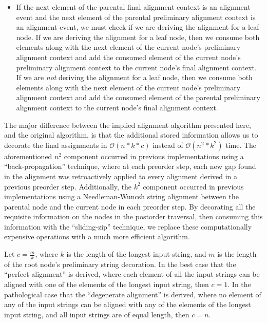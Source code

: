 \documentclass[11pt]{article}
\begin{document}
\begin{itemize}
\item If the next element of the parental final alignment context is an alignment event and the next element of the parental preliminary alignment context is an alignment event, we must check if we are deriving the alignment for a leaf node.
If we are deriving the alignment for a leaf node, then we consume both elements along with the next element of the current node's preliminary alignment context and add the consumed element of the current node's preliminary alignment context to the current node's final alignment context.
If we are \textit{not} deriving the alignment for a leaf node, then we consume both elements along with the next element of the current node's preliminary alignment context and add the consumed element of the parental preliminary alignment context to the current node's final alignment context.

\end{itemize}

The major difference between the implied alignment algorithm presented here, and the original algorithm, is that the additional stored information allows us to decorate the final assignments in $\mathcal{O}(n * k * c)$ instead of $\mathcal{O}(n^2*k^2)$ time. 
The aforementioned $n^2$ component occurred in previous implementations using a ``back-propagation'' technique, where at each preorder step, each new gap found in the alignment was retroactively applied to every alignment derived in a previous preorder step.
Additionally, the $k^2$ component occurred in previous implementations using a Needleman-Wuncsh string alignment between the parental node and the current node in each preorder step.
By decorating all the requisite information on the nodes in the postorder traversal, then consuming this information with the ``sliding-zip'' technique, we replace these computationally expensive operations with a much more efficient algorithm.

Let $c = \frac{m}{k}$, where $k$ is the length of the longest input string, and $m$ is the length of the root node's preliminary string decoration.
In the best case that the ``perfect alignment'' is derived, where each element of all the input strings can be aligned with one of the elements of the longest input string, then $c = 1$.
In the pathological case that the ``degenerate alignment'' is derived, where no element of any of the input strings can be aligned with any of the elements of the longest input string, and all input strings are of equal length, then $c = n$.
\end{document}
